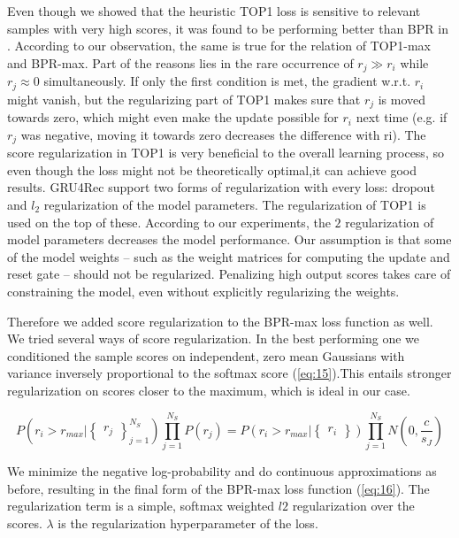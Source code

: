 \documentclass{article} %
\begin{document}
Even though we showed that the heuristic TOP1 loss is sensitive to relevant samples with very high scores, it was found to be performing better than BPR in \cite{hidasi2016a}. According to our observation, the same is true for the relation of TOP1-max and BPR-max. Part of the reasons lies in the rare occurrence of $r_j \gg r_i$ while $r_j ≈ 0$ simultaneously. If only the first condition is met, the gradient w.r.t. $r_i$ might vanish, but the regularizing part of TOP1 makes sure that $r_j$ is moved towards zero, which might even make the update possible for $r_i$ next time (e.g. if $r_j$ was negative, moving it towards zero decreases the difference with ri). The score regularization in TOP1 is very beneficial to the overall learning process, so even though the loss might not be theoretically optimal,it can achieve good results. GRU4Rec support two forms of regularization with every loss: dropout and $l_2$ regularization of the model parameters. The regularization of TOP1 is used on the top of these. According to our experiments, the $2$ regularization of model parameters decreases the model performance. Our assumption is that some of the model weights – such as the weight matrices for computing the update and reset gate – should not be regularized. Penalizing high output scores takes care of constraining the model, even without explicitly regularizing the weights.


Therefore we added score regularization to the BPR-max loss function as well. We tried several ways of score regularization. In the best performing one we conditioned the sample scores on
independent, zero mean Gaussians with variance inversely proportional to the softmax score (\ref{eq:15}).This entails stronger regularization on scores closer to the maximum, which is ideal in our case.

\begin{equation}\label{eq:15}
P(r_i > r_{max}|\begin{Bmatrix}
r_j
\end{Bmatrix}_{j=1}^{N_S})\prod_{j=1}^{N_S} P(r_j) = P (r_i > r_{max}| \begin{Bmatrix}
r_i
\end{Bmatrix} ) \prod_{j=1}^{N_S} N (0, \frac{c}{s_J})
\end{equation}



We minimize the negative log-probability and do continuous approximations as before, resulting in the final form of the BPR-max loss function (\ref{eq:16}). The regularization term is a simple, softmax weighted $l2$ regularization over the scores. $\lambda$ is the regularization hyperparameter of the loss.
\end{document}
